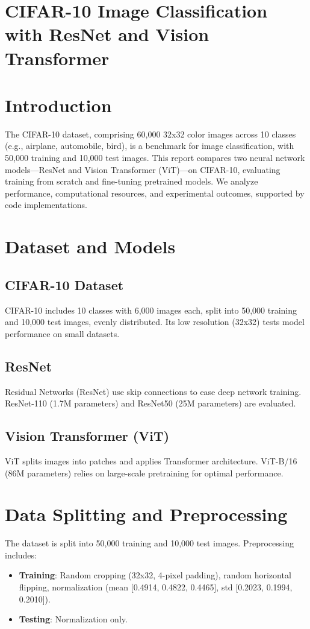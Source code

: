\documentclass[UTF8]{report}
\theoremstyle{MyLineTheoremStyle} %
\theoremstyle{MyBlockTheoremStyle} %
\theoremstyle{MySubsubsectionStyle} %
\begin{document}
\cleardoublepage


\section{CIFAR-10 Image Classification with ResNet and Vision Transformer}

\section*{Introduction}
The CIFAR-10 dataset, comprising 60,000 32x32 color images across 10 classes (e.g., airplane, automobile, bird), is a benchmark for image classification, with 50,000 training and 10,000 test images. This report compares two neural network models—ResNet and Vision Transformer (ViT)—on CIFAR-10, evaluating training from scratch and fine-tuning pretrained models. We analyze performance, computational resources, and experimental outcomes, supported by code implementations.

\section*{Dataset and Models}
\subsection*{CIFAR-10 Dataset}
CIFAR-10 includes 10 classes with 6,000 images each, split into 50,000 training and 10,000 test images, evenly distributed. Its low resolution (32x32) tests model performance on small datasets.

\subsection*{ResNet}
Residual Networks (ResNet) use skip connections to ease deep network training. ResNet-110 (1.7M parameters) and ResNet50 (25M parameters) are evaluated.

\subsection*{Vision Transformer (ViT)}
ViT splits images into patches and applies Transformer architecture. ViT-B/16 (86M parameters) relies on large-scale pretraining for optimal performance.

\section*{Data Splitting and Preprocessing}
The dataset is split into 50,000 training and 10,000 test images. Preprocessing includes:
\begin{itemize}
    \item \textbf{Training}: Random cropping (32x32, 4-pixel padding), random horizontal flipping, normalization (mean [0.4914, 0.4822, 0.4465], std [0.2023, 0.1994, 0.2010]).
    \item \textbf{Testing}: Normalization only.
\end{itemize}
\end{document}
